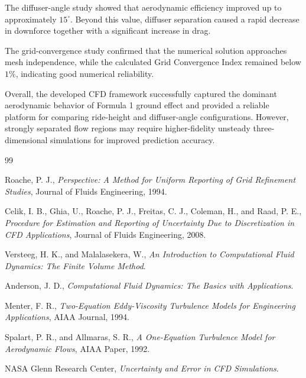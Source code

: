 \documentclass[12pt,a4paper]{article}
\begin{document}
The diffuser-angle study showed that aerodynamic efficiency improved up to
approximately \(15^\circ\). Beyond this value, diffuser separation caused a rapid decrease
in downforce together with a significant increase in drag.

The grid-convergence study confirmed that the numerical solution approaches mesh
independence, while the calculated Grid Convergence Index remained below \(1\%\),
indicating good numerical reliability.

Overall, the developed CFD framework successfully captured the dominant aerodynamic
behavior of Formula 1 ground effect and provided a reliable platform for comparing
ride-height and diffuser-angle configurations. However, strongly separated flow regions
may require higher-fidelity unsteady three-dimensional simulations for improved
prediction accuracy.

\newpage

\begin{thebibliography}{99}

Roache, P. J.,
\textit{Perspective: A Method for Uniform Reporting of Grid Refinement Studies},
Journal of Fluids Engineering, 1994.

Celik, I. B., Ghia, U., Roache, P. J., Freitas, C. J., Coleman, H., and Raad, P. E.,
\textit{Procedure for Estimation and Reporting of Uncertainty Due to Discretization in CFD Applications},
Journal of Fluids Engineering, 2008.

Versteeg, H. K., and Malalasekera, W.,
\textit{An Introduction to Computational Fluid Dynamics: The Finite Volume Method}.

Anderson, J. D.,
\textit{Computational Fluid Dynamics: The Basics with Applications}.

Menter, F. R.,
\textit{Two-Equation Eddy-Viscosity Turbulence Models for Engineering Applications},
AIAA Journal, 1994.

Spalart, P. R., and Allmaras, S. R.,
\textit{A One-Equation Turbulence Model for Aerodynamic Flows},
AIAA Paper, 1992.

NASA Glenn Research Center,
\textit{Uncertainty and Error in CFD Simulations}.

\end{thebibliography}
\end{document}
